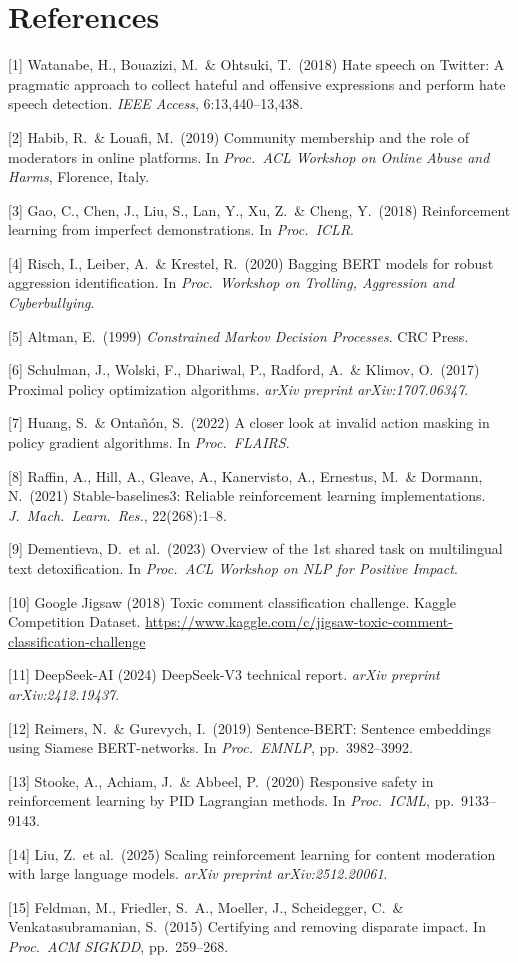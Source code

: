 \documentclass{article}
\begin{document}
\section*{References}

\medskip
{\small

[1] Watanabe, H., Bouazizi, M.\ \& Ohtsuki, T.\ (2018) Hate speech on Twitter:
A pragmatic approach to collect hateful and offensive expressions and perform
hate speech detection. {\it IEEE Access}, 6:13{,}440--13{,}438.

[2] Habib, R.\ \& Louafi, M.\ (2019) Community membership and the role of
moderators in online platforms. In {\it Proc.\ ACL Workshop on Online Abuse
and Harms}, Florence, Italy.

[3] Gao, C., Chen, J., Liu, S., Lan, Y., Xu, Z.\ \& Cheng, Y.\ (2018)
Reinforcement learning from imperfect demonstrations. In {\it Proc.\ ICLR}.

[4] Risch, I., Leiber, A.\ \& Krestel, R.\ (2020) Bagging BERT models for
robust aggression identification. In {\it Proc.\ Workshop on Trolling,
Aggression and Cyberbullying}.

[5] Altman, E.\ (1999) {\it Constrained Markov Decision Processes}.
CRC Press.

[6] Schulman, J., Wolski, F., Dhariwal, P., Radford, A.\ \& Klimov, O.\ (2017)
Proximal policy optimization algorithms. {\it arXiv preprint arXiv:1707.06347}.

[7] Huang, S.\ \& Onta\~n\'on, S.\ (2022) A closer look at invalid action
masking in policy gradient algorithms. In {\it Proc.\ FLAIRS}.

[8] Raffin, A., Hill, A., Gleave, A., Kanervisto, A., Ernestus, M.\ \& Dormann,
N.\ (2021) Stable-baselines3: Reliable reinforcement learning implementations.
{\it J.\ Mach.\ Learn.\ Res.}, 22(268):1--8.

[9] Dementieva, D.\ et al.\ (2023) Overview of the 1st shared task on
multilingual text detoxification. In {\it Proc.\ ACL Workshop on NLP for
Positive Impact}.

[10] Google Jigsaw (2018) Toxic comment classification challenge. Kaggle
Competition Dataset.
\url{https://www.kaggle.com/c/jigsaw-toxic-comment-classification-challenge}

[11] DeepSeek-AI (2024) DeepSeek-V3 technical report.
{\it arXiv preprint arXiv:2412.19437}.

[12] Reimers, N.\ \& Gurevych, I.\ (2019) Sentence-BERT: Sentence embeddings
using Siamese BERT-networks. In {\it Proc.\ EMNLP}, pp.\ 3982--3992.

[13] Stooke, A., Achiam, J.\ \& Abbeel, P.\ (2020) Responsive safety in
reinforcement learning by PID Lagrangian methods. In {\it Proc.\ ICML},
pp.\ 9133--9143.

[14] Liu, Z.\ et al.\ (2025) Scaling reinforcement learning for content
moderation with large language models. {\it arXiv preprint arXiv:2512.20061}.

[15] Feldman, M., Friedler, S.~A., Moeller, J., Scheidegger, C.\ \&
Venkatasubramanian, S.\ (2015) Certifying and removing disparate impact.
In {\it Proc.\ ACM SIGKDD}, pp.\ 259--268.

}
\end{document}
